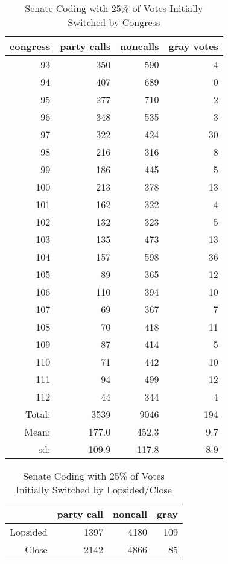 \documentclass[12pt]{article}
\begin{document}
\begin{table}[ht]
	\centering
	\caption{Senate Coding with 25\% of Votes Initially Switched by Congress}
	\begin{tabular}{rrrr}
		\hline
		congress & party calls & noncalls & gray votes \\
		\hline
		93 & 350 & 590 &   4 \\
		94 & 407 & 689 &   0 \\
		95 & 277 & 710 &   2 \\
		96 & 348 & 535 &   3 \\
		97 & 322 & 424 &  30 \\
		98 & 216 & 316 &   8 \\
		99 & 186 & 445 &   5 \\
		100 & 213 & 378 &  13 \\
		101 & 162 & 322 &   4 \\
		102 & 132 & 323 &   5 \\
		103 & 135 & 473 &  13 \\
		104 & 157 & 598 &  36 \\
		105 &  89 & 365 &  12 \\
		106 & 110 & 394 &  10 \\
		107 &  69 & 367 &   7 \\
		108 &  70 & 418 &  11 \\
		109 &  87 & 414 &   5 \\
		110 &  71 & 442 &  10 \\
		111 &  94 & 499 &  12 \\
		112 &  44 & 344 &   4 \\
		\hline
		Total: & 3539 & 9046 & 194 \\
		Mean: & 177.0 & 452.3 & 9.7 \\
		sd: & 109.9 & 117.8 & 8.9 \\
		\hline
	\end{tabular}
\end{table}

\begin{table}[ht]
	\centering
		\caption{Senate Coding with 25\% of Votes Initially Switched by Lopsided/Close}
	\begin{tabular}{rrrr}
		\hline
		& party call  & noncall & gray \\
		\hline
		Lopsided & 1397 & 4180 & 109 \\
		Close & 2142 & 4866 & 85 \\
		\hline
	\end{tabular}
\end{table}
\end{document}
